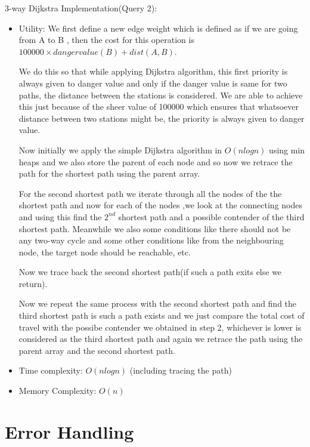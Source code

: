 \documentclass{article}
\begin{document}
3-way Dijkstra Implementation(Query 2): 
	{\begin{itemize}
        \item Utility: We first define a new edge weight which is defined as if we are going from A to B , then the cost for this operation is $100000\times dangervalue(B) + dist(A,B)$.
        
        We do this so that while applying Dijkstra algorithm, this first priority is always given to danger value and only if the danger value is same for two paths, the distance between the stations is considered. We are able to achieve this just because of the sheer value of 100000 which ensures that whatsoever distance between two stations might be, the priority is always given to danger value.
        
Now initially we apply the simple Dijkstra algorithm in $O(nlogn)$ using min heaps and we also store the parent of each node and so now we retrace the path for the shortest path using the parent array.

For the second shortest path we iterate through all the nodes of the the shortest path and now for each of the nodes ,we look at the connecting nodes and using this find the $2^{nd}$ shortest path and a possible contender of the third shortest path. Meanwhile we also some conditions like there should not be any two-way cycle and some other conditions like from the neighbouring node, the target node should be reachable, etc.

Now we trace back the second shortest path(if such a path exits else we return).

Now we repeat the same process with the second shortest path and find the third shortest path is such a path exists and we just compare the total cost of travel with the possibe contender we obtained in step 2, whichever is lower is considered as the third shortest path and again we retrace the path using the parent array and the second shortest path.


		\item Time complexity: $O(nlog n)$ (including tracing the path)
	    \item Memory Complexity: $O(n)$
    \end{itemize}
	}


\newpage
\section{Error Handling}

\newpage
\end{document}
